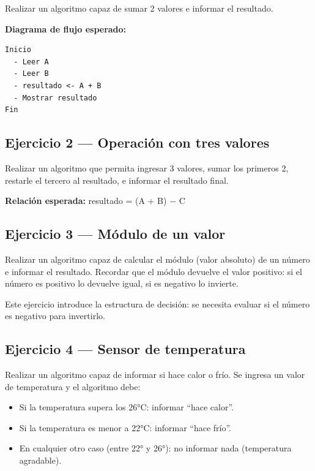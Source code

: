 Realizar un algoritmo capaz de sumar 2 valores e informar el resultado.

\textbf{Diagrama de flujo esperado:}

\begin{lstlisting}[style=estilo-pseudocode]
Inicio
  - Leer A
  - Leer B
  - resultado <- A + B
  - Mostrar resultado
Fin
\end{lstlisting}


\subsection{Ejercicio 2 --- Operación con tres valores}

Realizar un algoritmo que permita ingresar 3 valores, sumar los primeros 2, restarle el tercero al resultado, e informar el resultado final.

\textbf{Relación esperada:} resultado = (A + B) $-$ C


\subsection{Ejercicio 3 --- Módulo de un valor}

Realizar un algoritmo capaz de calcular el módulo (valor absoluto) de un número e informar el resultado. Recordar que el módulo devuelve el valor positivo: si el número es positivo lo devuelve igual, si es negativo lo invierte.

\begin{advertenciabox}
Este ejercicio introduce la estructura de decisión: se necesita evaluar si el número es negativo para invertirlo.
\end{advertenciabox}


\subsection{Ejercicio 4 --- Sensor de temperatura}

Realizar un algoritmo capaz de informar si hace calor o frío. Se ingresa un valor de temperatura y el algoritmo debe:

\begin{itemize}
    \item Si la temperatura supera los 26°C: informar ``hace calor''.
    \item Si la temperatura es menor a 22°C: informar ``hace frío''.
    \item En cualquier otro caso (entre 22° y 26°): no informar nada (temperatura agradable).
\end{itemize}

